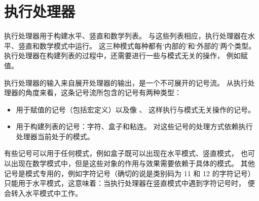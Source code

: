 \documentclass{book}
\begin{document}
\section{执行处理器}

执行处理器用于构建水平、竖直和数学列表。
与这些列表相应，执行处理器在水平、竖直和数学模式中运行。
这三种模式每种都有`内部的'和`外部的'两个类型。
执行处理器在构建列表的过程中，还需要进行一些与模式无关的操作，
例如赋值。

执行处理器的输入来自展开处理器的输出，是一个不可展开的记号流。
从执行处理器的角度来看，这条记号流所包含的记号有两种类型：
\begin{itemize}
\item 用于赋值的记号（包括宏定义）以及像 、
  这样执行与模式无关操作的记号。
\item 用于构建列表的记号：字符、盒子和粘连。
  对这些记号的处理方式依赖执行处理器当前处于的模式。
\end{itemize}

有些记号可以用于任何模式，例如盒子既可以出现在水平模式、竖直模式，
也可以出现在数学模式中，但是这些对象的作用与效果需要依赖于具体的模式。
其他记号是模式专用的，例如字符记号（确切的说是类别码为 11 和 12 的字符记号）%
只能用于水平模式，这意味着：当执行处理器在竖直模式中遇到字符记号时，
便会转入水平模式中工作。
\end{document}
